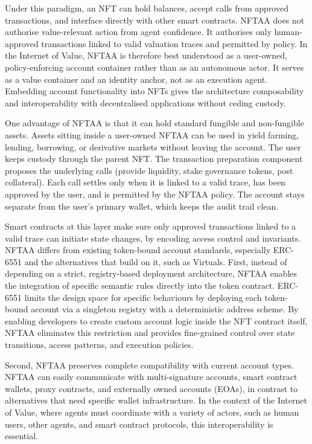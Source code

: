Under this paradigm, an NFT can hold balances, accept calls from approved transactions, and interface directly with other smart contracts. NFTAA does not authorise value-relevant action from agent confidence. It authorises only human-approved transactions linked to valid valuation traces and permitted by policy. In the Internet of Value, NFTAA is therefore best understood as a user-owned, policy-enforcing account container rather than as an autonomous actor. It serves as a value container and an identity anchor, not as an execution agent. Embedding account functionality into NFTs gives the architecture composability and interoperability with decentralised applications without ceding custody.

One advantage of NFTAA is that it can hold standard fungible and non-fungible assets. Assets sitting inside a user-owned NFTAA can be used in yield farming, lending, borrowing, or derivative markets without leaving the account. The user keeps custody through the parent NFT. The transaction preparation component proposes the underlying calls (provide liquidity, stake governance tokens, post collateral). Each call settles only when it is linked to a valid trace, has been approved by the user, and is permitted by the NFTAA policy. The account stays separate from the user's primary wallet, which keeps the audit trail clean.

Smart contracts at this layer make sure only approved transactions linked to a valid trace can initiate state changes, by encoding access control and invariants. NFTAA differs from existing token-bound account standards, especially ERC-6551 \cite{Wang2023} and the alternatives that build on it, such as Virtuals.
First, instead of depending on a strict, registry-based deployment architecture, NFTAA enables the integration of specific semantic rules directly into the token contract. ERC-6551 limits the design space for specific behaviours by deploying each token-bound account via a singleton registry with a deterministic address scheme. By enabling developers to create custom account logic inside the NFT contract itself, NFTAA eliminates this restriction and provides fine-grained control over state transitions, access patterns, and execution policies.

Second, NFTAA preserves complete compatibility with current account types. NFTAA can easily communicate with multi-signature accounts, smart contract wallets, proxy contracts, and externally owned accounts (EOAs), in contrast to alternatives that need specific wallet infrastructure. In the context of the Internet of Value, where agents must coordinate with a variety of actors, such as human users, other agents, and smart contract protocols, this interoperability is essential.


